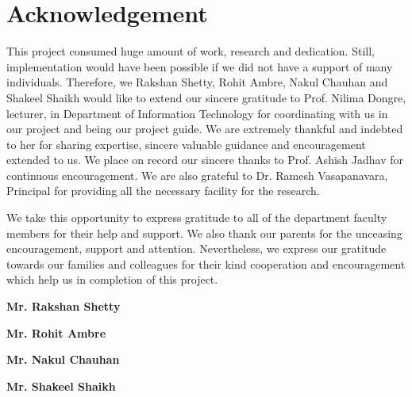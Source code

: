 \chapter*{Acknowledgement}
\hspace{0.26in}This project consumed huge amount of work, research and dedication. Still, implementation would have been possible if we did not have a support of many individuals. Therefore, we Rakshan Shetty, Rohit Ambre, Nakul Chauhan and Shakeel Shaikh would like to extend our sincere gratitude to Prof. Nilima Dongre, lecturer, in Department of Information Technology for coordinating with us in our project and being our project guide. We are extremely thankful and indebted to her for sharing expertise, sincere valuable guidance and encouragement extended to us. We place on record our sincere thanks to Prof. Ashish Jadhav for continuous encouragement. We are also grateful to Dr. Ramesh Vasapanavara, Principal for providing all the necessary facility for the research. 
\par We take this opportunity to express gratitude to all of the department faculty members for their help and support. We also thank our parents for the unceasing encouragement, support and attention. Nevertheless, we express our gratitude towards our families and colleagues for their kind cooperation and encouragement which help us in completion of this project.

\vspace{0.5in}
\begin{flushright}
{\bf Mr. Rakshan Shetty}
\end{flushright}

\begin{flushright}
{\bf Mr. Rohit Ambre}
\end{flushright}

\begin{flushright}
{\bf Mr. Nakul Chauhan}
\end{flushright}

\begin{flushright}
{\bf Mr. Shakeel Shaikh}
\end{flushright}